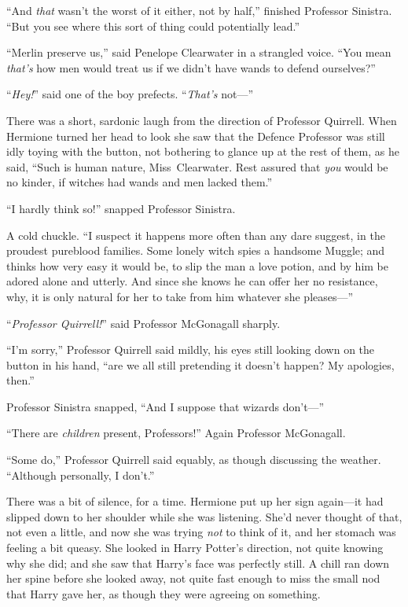 “And \emph{that} wasn’t the worst of it either, not by half,” finished Professor Sinistra. “But you see where this sort of thing could potentially lead.”

“Merlin preserve us,” said Penelope Clearwater in a strangled voice. “You mean \emph{that’s} how men would treat us if we didn’t have wands to defend ourselves?”

“\emph{Hey!}” said one of the boy prefects. “\emph{That’s} not—”

There was a short, sardonic laugh from the direction of Professor Quirrell. When Hermione turned her head to look she saw that the Defence Professor was still idly toying with the button, not bothering to glance up at the rest of them, as he said, “Such is human nature, Miss~Clearwater. Rest assured that \emph{you} would be no kinder, if witches had wands and men lacked them.”

“I hardly think so!” snapped Professor Sinistra.

A cold chuckle. “I suspect it happens more often than any dare suggest, in the proudest pureblood families. Some lonely witch spies a handsome Muggle; and thinks how very easy it would be, to slip the man a love potion, and by him be adored alone and utterly. And since she knows he can offer her no resistance, why, it is only natural for her to take from him whatever she pleases—”

“\emph{Professor Quirrell!}” said Professor McGonagall sharply.

“I’m sorry,” Professor Quirrell said mildly, his eyes still looking down on the button in his hand, “are we all still pretending it doesn’t happen? My apologies, then.”

Professor Sinistra snapped, “And I suppose that wizards don’t—”

“There are \emph{children} present, Professors!” Again Professor McGonagall.

“Some do,” Professor Quirrell said equably, as though discussing the weather. “Although personally, I don’t.”

There was a bit of silence, for a time. Hermione put up her sign again—it had slipped down to her shoulder while she was listening. She’d never thought of that, not even a little, and now she was trying \emph{not} to think of it, and her stomach was feeling a bit queasy. She looked in Harry Potter’s direction, not quite knowing why she did; and she saw that Harry’s face was perfectly still. A chill ran down her spine before she looked away, not quite fast enough to miss the small nod that Harry gave her, as though they were agreeing on something.

